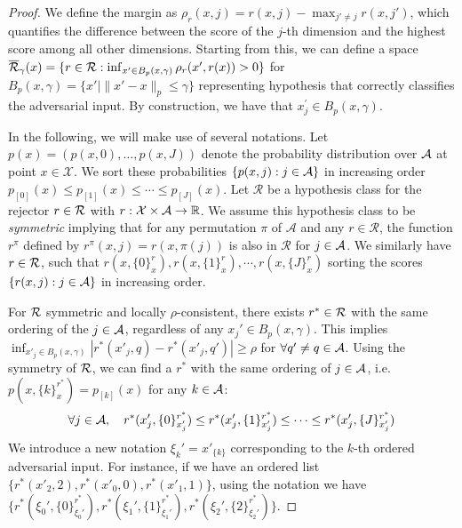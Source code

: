 \begin{appendices}
\begin{proof}

We define the margin as $\rho_r(x, j) = r(x, j) - \max_{j' \neq j} r(x, j')$, which quantifies the difference between the score of the $j$-th dimension and the highest score among all other dimensions. Starting from this, we can define a space $\overline{\mathcal{R}}_{\gamma}(x) = \{r\in\mathcal{R}: \inf_{x^\prime \in B_p(x,\gamma)}\rho_r(x^\prime, r(x))>0\}$ for $B_p(x, \gamma) = \{ x' \mid \|x' - x\|_p \leq \gamma \}$ representing hypothesis that correctly classifies the adversarial input. By construction, we have that $x_j^\prime \in B_p(x,\gamma)$. 

In the following, we will make use of several notations. Let $p(x) = (p(x, 0), \ldots, p(x, J))$ denote the probability distribution over $\mathcal{A}$ at point $x \in \mathcal{X}$. We sort these probabilities $\{p(x,j):j\in\mathcal{A}\}$ in increasing order $p_{[0]}(x) \leq p_{[1]}(x) \leq \cdots \leq p_{[J]}(x)$. Let $\mathcal{R}$ be a hypothesis class for the rejector $r\in\mathcal{R}$ with $r:\mathcal{X}\times\mathcal{A}\rightarrow\mathbb{R}$. We assume this hypothesis class to be \textit{symmetric} implying that for any permutation $\pi$ of $\mathcal{A}$ and any $r \in \mathcal{R}$, the function $r^\pi$ defined by $r^\pi(x, j) = r(x, \pi(j))$ is also in $\mathcal{R}$ for $j\in\mathcal{A}$. We similarly have $r\in\mathcal{R}$, such that $r(x,\{0\}_x^r), r(x,\{1\}_x^r), \cdots, r(x,\{J\}_x^r)$ sorting the scores $\{ r(x,j): j\in\mathcal{A}\}$ in increasing order.


For $\mathcal{R}$ symmetric and locally $\rho$-consistent, there exists $r^*\in\mathcal{R}$ with the same ordering of the $j\in\mathcal{A}$, regardless of any $x_j' \in B_p(x,\gamma)$. This implies  $\inf_{x'_j \in B_p(x,\gamma)}|r^*(x'_j, q) - r^*(x'_j, q')| \geq \rho$ for $\forall q' \neq q \in \mathcal{A}$. Using the symmetry of $\mathcal{R}$, we can find a $r^\ast$ with the same ordering of $j\in\mathcal{A}$, i.e. $p(x,\{k\}_{x}^{r^\ast}) = p_{[k]}(x)$ for any $k\in\mathcal{A}$:
\begin{equation}
   \forall j \in \mathcal{A}, \quad r^\ast(x'_j, \{0\}_{x'_j}^{r^\ast}) \leq r^\ast(x'_j, \{1\}_{x'_j}^{r^\ast}) \leq \cdots \leq r^\ast(x'_j, \{J\}^{r^\ast}_{x'_j})
\end{equation}
We introduce a new notation $\xi_k'=x'_{\{k\}}$ corresponding to the $k$-th ordered adversarial input. For instance, if we have an ordered list $\{r^*(x'_2,2), r^*(x'_0, 0), r^*(x'_1,1)\}$, using the notation we have $\{r^*(\xi_0', \{0\}_{\xi_0'}^{r^\ast}), r^*(\xi_1', \{1\}_{\xi_1'}^{r^\ast}), r^*(\xi_2', \{2\}_{\xi_2'}^{r^\ast}) \}$.  


\end{proof}
\end{appendices}
